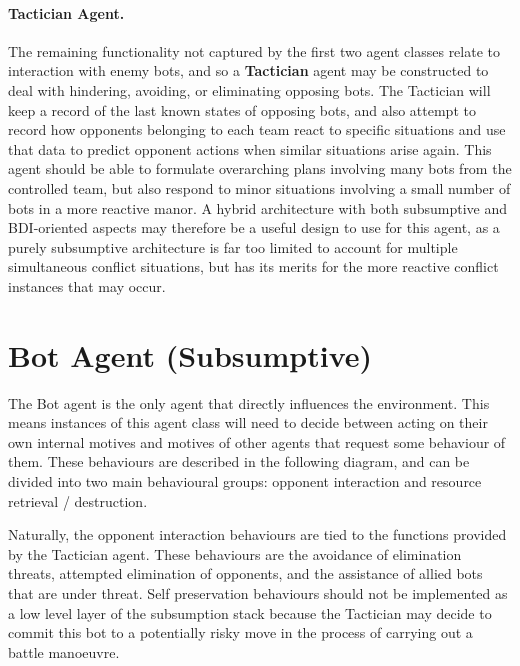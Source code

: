 \documentclass[a4paper,10pt]{article}
\begin{document}
\paragraph{Tactician Agent.}
The remaining functionality not captured by the first two agent classes relate to interaction with enemy bots, and so a \textbf{Tactician} agent may be constructed to deal with hindering, avoiding, or eliminating opposing bots. The Tactician will keep a record of the last known states of opposing bots, and also attempt to record how opponents belonging to each team react to specific situations and use that data to predict opponent actions when similar situations arise again. This agent should be able to formulate overarching plans involving many bots from the controlled team, but also respond to minor situations involving a small number of bots in a more reactive manor. A hybrid architecture with both subsumptive and BDI-oriented aspects may therefore be a useful design to use for this agent, as a purely subsumptive architecture is far too limited to account for multiple simultaneous conflict situations, but has its merits for the more reactive conflict instances that may occur.

\section{Bot Agent (Subsumptive)}

The Bot agent is the only agent that directly influences the environment. This means instances of this agent class will need to decide between acting on their own internal motives and motives of other agents that request some behaviour of them. These behaviours are described in the following diagram, and can be divided into two main behavioural groups: opponent interaction and resource retrieval / destruction.

Naturally, the opponent interaction behaviours are tied to the functions provided by the Tactician agent. These behaviours are the avoidance of elimination threats, attempted elimination of opponents, and the assistance of allied bots that are under threat. Self preservation behaviours should not be implemented as a low level layer of the subsumption stack because the Tactician may decide to commit this bot to a potentially risky move in the process of carrying out a battle manoeuvre.
\end{document}
